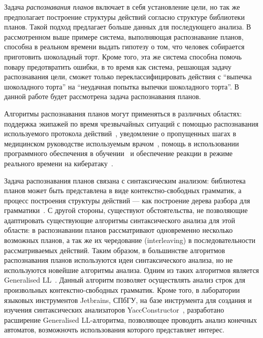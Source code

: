 \documentclass[14pt]{matmex-diploma-custom}
\begin{document}
	Задача \textit{распознавания планов} включает в себя установление цели, но так же предполагает построение структуры действий согласно
    структуре библиотеки планов. Такой подход предлагает больше данных для последующего анализа.
    В рассмотренном выше примере система, выполняющая распознавание планов, способна в реальном времени выдать
    гипотезу о том, что человек собирается приготовить шоколадный торт. Кроме того, эта же система способна помочь 
    повару предотвратить ошибки, в то время как система, решающая задачу распознавания цели, сможет только переклассифицировать действия с
    ``выпечка шоколадного торта'' на ``неудачная попытка выпечки шоколадного торта''.
    В данной работе будет рассмотрена задача распознавания планов.    
    
    Алгоритмы распознавания планов могут применяться в различных областях: поддержка экипажей по время чрезвычайных ситуаций с помощью распознавания 
    используемого протокола действий~\cite{BlaylockandAllen2006}, уведомление о пропущенных шагах в медицинском руководстве используемым
    врачом~\cite{CharniakandGoldman,NgandMooney1992}, помощь в использовании программного обеспечения в обучении~\cite{AmirandGal2013,Uzan2015}
    и обеспечение реакции в режиме реального времени на кибератаку~\cite{Bisson2011,QinandLee2004}.
	
    Задача распознавания планов связана с синтаксическим анализом: библиотека планов может быть представлена в виде контекстно-свободных грамматик,
    а процесс построения структуры действий --- как построение дерева разбора для грамматики~\cite{maraist2016}. С другой стороны, существуют обстоятельства,
    не позволяющие адаптировать существующие алгоритмы синтаксического анализа для этой области: в распознавании
    планов рассматривают одновременно несколько возможных планов, а так же их чередование (interleaving) в последовательности рассматриваемых действий.
    Таким образом, в большинстве алгоритмов распознавания планов используются идеи синтаксического анализа, но не используются новейшие 
    алгоритмы анализа. Одним из таких алгоритмов является Generalised LL~\cite{scott2010gll}. Данный алгоритм позволяет осуществлять анализ строк
    для произвольных контекстно-свободных грамматик. Кроме того, в лаборатории языковых инструментов Jetbrains, СПбГУ,
    на базе инструмента для создания и изучения синтаксических анализаторов YaccConstructor~\cite{YCUrl}, разработано расширение Generalised LL-алгоритма, позволяющее проводить анализ конечных автоматов, возможночть использования которого представляет интерес.
\end{document}
